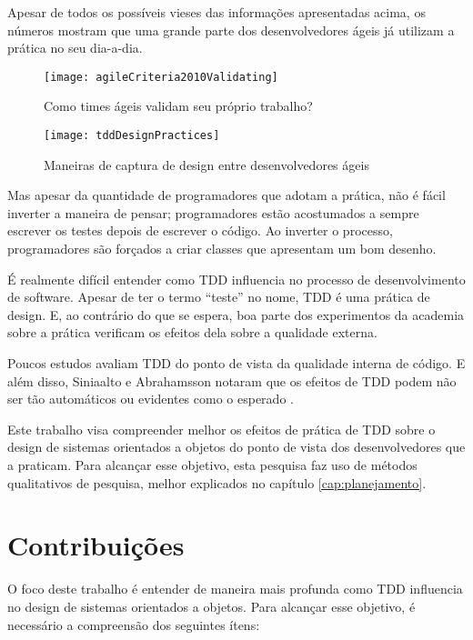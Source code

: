 Apesar de todos os possíveis vieses das informações apresentadas acima, os
números mostram que uma grande parte dos desenvolvedores ágeis já utilizam a 
prática no seu dia-a-dia.

\begin{figure}[h]
  \centering
  \texttt{[image: agileCriteria2010Validating]}
  \caption{Como times ágeis validam seu próprio trabalho?}
  \label{fig:wambler-agile-2010}
\end{figure}

\begin{figure}[h]
  \centering
  \texttt{[image: tddDesignPractices]}
  \caption{Maneiras de captura de design entre desenvolvedores ágeis}   
  \label{fig:wambler-tdd-2008}
\end{figure}

Mas apesar da quantidade de programadores que adotam a prática, não é
fácil inverter a maneira de pensar; programadores estão acostumados a sempre
escrever os testes depois de escrever o código. Ao inverter o processo,
programadores são forçados a criar classes que apresentam um bom desenho.

É realmente difícil entender como TDD influencia no processo de desenvolvimento
de software. Apesar de ter o termo ``teste'' no nome, TDD é uma prática
de design. E, ao contrário do que se espera, boa parte dos experimentos da
academia sobre a prática verificam os efeitos dela sobre a qualidade externa. 

Poucos estudos avaliam TDD do ponto de vista da qualidade interna de código. E
além disso, Siniaalto e Abrahamsson notaram que os efeitos de TDD podem não ser
tão automáticos ou evidentes como o esperado \cite{alarming-results}.

Este trabalho visa compreender melhor os efeitos de prática de TDD sobre o
design de sistemas orientados a objetos do ponto de vista dos desenvolvedores
que a praticam. Para alcançar esse objetivo, esta pesquisa faz uso de métodos
qualitativos de pesquisa, melhor explicados no capítulo \ref{cap:planejamento}.

\section{Contribuições}

O foco deste trabalho é entender de maneira mais profunda como TDD influencia no
design de sistemas orientados a objetos. Para alcançar esse objetivo, é necessário a
compreensão dos seguintes ítens:

